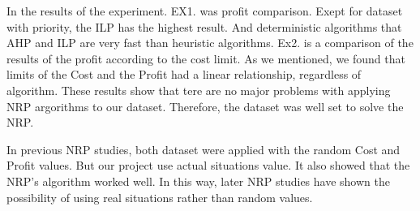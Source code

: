 In the results of the experiment.
EX1. was profit comparison. Exept for dataset with priority, the ILP has the highest result. And deterministic algorithms that AHP and ILP are very fast than heuristic algorithms. Ex2. is a comparison of the results of the profit according to the cost limit. As we mentioned, we found that limits of the Cost and the Profit had a linear relationship, regardless of algorithm. These results show that tere are no major problems with applying NRP argorithms to our dataset. Therefore, the dataset was well set to solve  the NRP.

In previous NRP studies, both dataset were applied with the random Cost and Profit values. But our project use actual situations value. It also showed that the NRP's algorithm worked well. In this way, later NRP studies have shown the possibility of using real situations rather than random values. 



